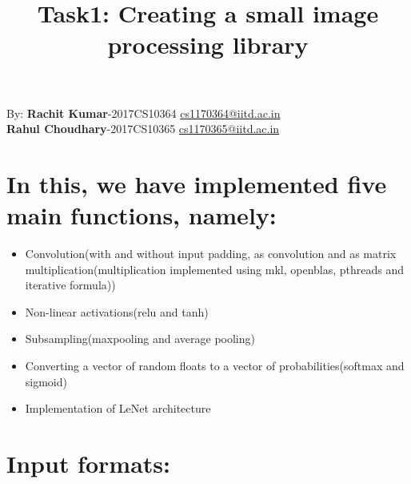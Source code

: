 \documentclass{article}
\date{\vspace{-10ex}}
\title{Task1: Creating a small image processing library}
\begin{document}
\maketitle


By: \textbf{Rachit Kumar}-2017CS10364  \href{mailto:cs1170364@iitd.ac.in}{cs1170364@iitd.ac.in}
\\
\textbf{ Rahul Choudhary}-2017CS10365 \href{mailto:cs1170365@iitd.ac.in}{cs1170365@iitd.ac.in}

\section{In this, we have implemented five main functions, namely:}

\begin{itemize}
\tightlist
\item
  Convolution(with and without input padding, as convolution and as
  matrix multiplication(multiplication implemented using mkl, openblas,
  pthreads and iterative formula))
\item
  Non-linear activations(relu and tanh)
\item
  Subsampling(maxpooling and average pooling)
\item
  Converting a vector of random floats to a vector of
  probabilities(softmax and sigmoid)
 \item 
  Implementation of LeNet architecture 
\end{itemize}

\section{Input formats:}
\end{document}
